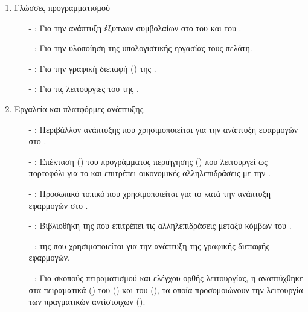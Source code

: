 \begin{enumerate}
    \item Γλώσσες προγραμματισμού
    \begin{itemize}
        \item[-] : Για την ανάπτυξη έξυπνων συμβολαίων στο  του  και του . 
        \item[-] : Για την υλοποίηση της υπολογιστικής εργασίας τους πελάτη.
        \item[-] : Για την γραφική διεπαφή () της .
        \item[-] : Για τις λειτουργίες του  της .
    \end{itemize}
    \item Εργαλεία και πλατφόρμες ανάπτυξης
    \begin{itemize}
        \item[-] : Περιβάλλον ανάπτυξης που χρησιμοποιείται για την ανάπτυξη εφαρμογών στο .
        \item[-] : Επέκταση () του προγράμματος περιήγησης () που λειτουργεί ως πορτοφόλι για το  και επιτρέπει οικονομικές αλληλεπιδράσεις με την .
        \item[-] : Προσωπικό τοπικό  που χρησιμοποιείται για το  κατά την ανάπτυξη εφαρμογών στο .
        \item[-] : Βιβλιοθήκη της  που επιτρέπει τις αλληλεπιδράσεις μεταξύ κόμβων του .
        \item[-] :  της  που χρησιμοποιείται για την ανάπτυξη της γραφικής διεπαφής εφαρμογών.
        \item[-] : Για σκοπούς πειραματισμού και ελέγχου ορθής λειτουργίας, η  αναπτύχθηκε στα πειραματικά  () του  () και του  (), τα οποία προσομοιώνουν την λειτουργία των πραγματικών αντίστοιχων  ().
    \end{itemize}
\end{enumerate}

